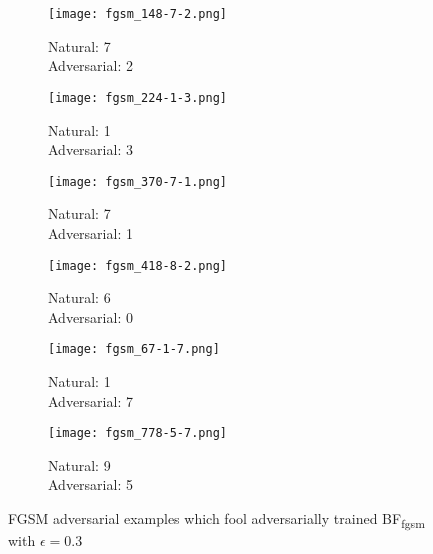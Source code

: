 \documentclass{article} %
\begin{document}
\begin{figure}[htb]
\centering
\captionsetup[subfigure]{labelformat=empty}
\begin{subfigure}{.3\textwidth}
  \centering
  \texttt{[image: fgsm\_148-7-2.png]}
  \caption{Natural: 7\\Adversarial: 2}
\end{subfigure}%
\begin{subfigure}{.3\textwidth}
  \centering
  \texttt{[image: fgsm\_224-1-3.png]}
  \caption{Natural: 1\\Adversarial: 3}
\end{subfigure}
\begin{subfigure}{.3\textwidth}
  \centering
  \texttt{[image: fgsm\_370-7-1.png]}
  \caption{Natural: 7\\Adversarial: 1}
\end{subfigure}
\begin{subfigure}{.3\textwidth}
  \centering
  \texttt{[image: fgsm\_418-8-2.png]}
  \caption{Natural: 6\\Adversarial: 0}
\end{subfigure}
\begin{subfigure}{.3\textwidth}
  \centering
  \texttt{[image: fgsm\_67-1-7.png]}
  \caption{Natural: 1\\Adversarial: 7}
\end{subfigure}
\begin{subfigure}{.3\textwidth}
  \centering
  \texttt{[image: fgsm\_778-5-7.png]}
  \caption{Natural: 9\\Adversarial: 5}
\end{subfigure}
\caption{FGSM adversarial examples which fool adversarially trained BF\textsubscript{fgsm} with $\epsilon = 0.3$}
\label{fig:fgsmfail}
\end{figure}
\end{document}
